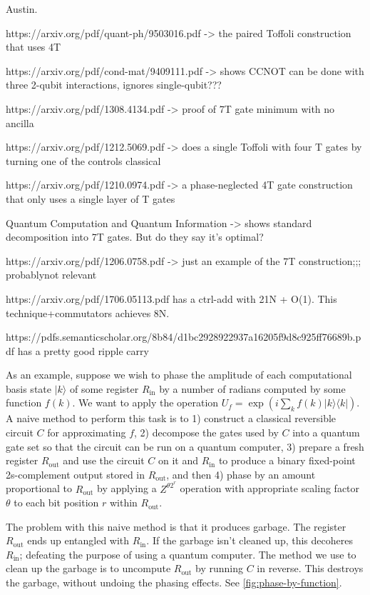 \documentclass[twocolumn,longbibliography]{quantumarticle-customized}
\begin{document}
Austin.





https://arxiv.org/pdf/quant-ph/9503016.pdf   ->   the paired Toffoli construction that uses 4T

https://arxiv.org/pdf/cond-mat/9409111.pdf   -> shows CCNOT can be done with three 2-qubit interactions, ignores single-qubit???


https://arxiv.org/pdf/1308.4134.pdf -> proof of 7T gate minimum with no ancilla

https://arxiv.org/pdf/1212.5069.pdf  ->   does a single Toffoli with four T gates by turning one of the controls classical

https://arxiv.org/pdf/1210.0974.pdf  ->   a phase-neglected 4T gate construction that only uses a single layer of T gates


Quantum Computation and Quantum Information -> shows standard decomposition into 7T gates. But do they say it's optimal?

https://arxiv.org/pdf/1206.0758.pdf -> just an example of the 7T construction;;; probablynot relevant



https://arxiv.org/pdf/1706.05113.pdf   has a ctrl-add with 21N + O(1). This technique+commutators achieves 8N.


https://pdfs.semanticscholar.org/8b84/d1bc2928922937a16205f9d8c925ff76689b.pdf     has a pretty good ripple carry








As an example, suppose we wish to phase the amplitude of each computational basis state $|k\rangle$ of some register $R_{\text{in}}$ by a number of radians computed by some function $f(k)$.
We want to apply the operation $U_f = \exp\left( i \sum_k f(k) |k\rangle \langle k| \right)$.
A naive method to perform this task is to 1) construct a classical reversible circuit $C$ for approximating $f$, 2) decompose the gates used by $C$ into a quantum gate set so that the circuit can be run on a quantum computer, 3) prepare a fresh register $R_\text{out}$ and use the circuit $C$ on it and $R_\text{in}$ to produce a binary fixed-point 2s-complement output stored in $R_{\text{out}}$, and then 4) phase by an amount proportional to $R_\text{out}$ by applying a $Z^{\theta 2^r}$ operation with appropriate scaling factor $\theta$ to each bit position $r$ within $R_\text{out}$.

The problem with this naive method is that it produces garbage.
The register $R_\text{out}$ ends up entangled with $R_\text{in}$.
If the garbage isn't cleaned up, this decoheres $R_\text{in}$; defeating the purpose of using a quantum computer.
The method we use to clean up the garbage is to uncompute $R_\text{out}$ by running $C$ in reverse.
This destroys the garbage, without undoing the phasing effects.
See \autoref{fig:phase-by-function}.
\end{document}
